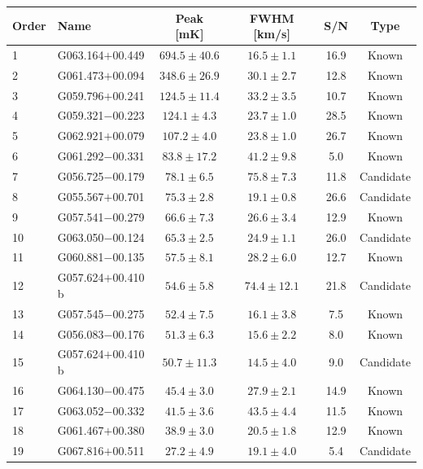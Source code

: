 \begin{table}[H]
    \centering
    \small
    \begin{tabular}{l l c c c c}
        \toprule
        Order & Name & Peak [mK] & FWHM [km/s] & S/N & Type \\
        \midrule
        1 & G063.164$+$00.449 & $694.5 \pm 40.6$ & $16.5 \pm 1.1$ & 16.9 & Known \\
        2 & G061.473$+$00.094 & $348.6 \pm 26.9$ & $30.1 \pm 2.7$ & 12.8 & Known \\
        3 & G059.796$+$00.241 & $124.5 \pm 11.4$ & $33.2 \pm 3.5$ & 10.7 & Known \\
        4 & G059.321$-$00.223 & $124.1 \pm 4.3$ & $23.7 \pm 1.0$ & 28.5 & Known \\
        5 & G062.921$+$00.079 & $107.2 \pm 4.0$ & $23.8 \pm 1.0$ & 26.7 & Known \\
        6 & G061.292$-$00.331 & $83.8 \pm 17.2$ & $41.2 \pm 9.8$ & 5.0 & Known \\
        7 & G056.725$-$00.179 & $78.1 \pm 6.5$ & $75.8 \pm 7.3$ & 11.8 & Candidate \\
        8 & G055.567$+$00.701 & $75.3 \pm 2.8$ & $19.1 \pm 0.8$ & 26.6 & Candidate \\
        9 & G057.541$-$00.279 & $66.6 \pm 7.3$ & $26.6 \pm 3.4$ & 12.9 & Known \\
        10 & G063.050$-$00.124 & $65.3 \pm 2.5$ & $24.9 \pm 1.1$ & 26.0 & Candidate \\
        11 & G060.881$-$00.135 & $57.5 \pm 8.1$ & $28.2 \pm 6.0$ & 12.7 & Known \\
        12 & G057.624$+$00.410 b & $54.6 \pm 5.8$ & $74.4 \pm 12.1$ & 21.8 & Candidate \\
        13 & G057.545$-$00.275 & $52.4 \pm 7.5$ & $16.1 \pm 3.8$ & 7.5 & Known \\
        14 & G056.083$-$00.176 & $51.3 \pm 6.3$ & $15.6 \pm 2.2$ & 8.0 & Known \\
        15 & G057.624$+$00.410 b & $50.7 \pm 11.3$ & $14.5 \pm 4.0$ & 9.0 & Candidate \\
        16 & G064.130$-$00.475 & $45.4 \pm 3.0$ & $27.9 \pm 2.1$ & 14.9 & Known \\
        17 & G063.052$-$00.332 & $41.5 \pm 3.6$ & $43.5 \pm 4.4$ & 11.5 & Known \\
        18 & G061.467$+$00.380 & $38.9 \pm 3.0$ & $20.5 \pm 1.8$ & 12.9 & Known \\
        19 & G067.816$+$00.511 & $27.2 \pm 4.9$ & $19.1 \pm 4.0$ & 5.4 & Candidate \\

\end{tabular}
\end{table}
